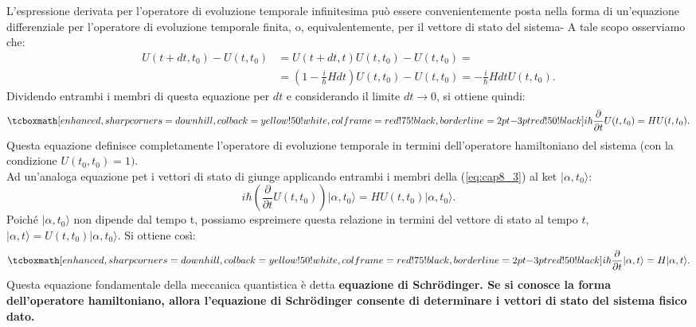 L'espressione derivata per l'operatore di evoluzione temporale infinitesima può essere convenientemente posta nella forma di un'equazione differenziale per l'operatore di evoluzione temporale finita, o, equivalentemente, per il vettore di stato del sistema- A tale scopo osserviamo che:
	\begin{align}
		U(t+dt,t_0)-U(t,t_0)&=  U(t+dt,t)U(t,t_0)-U(t,t_0)= \nonumber\\
		& =\left(1-\frac{i}{\hbar}Hdt \right)U(t,t_0)-U(t,t_0)=-\frac{i}{\hbar}Hdt U(t,t_0).
	\end{align}
Dividendo entrambi i membri di questa equazione per $dt$ e considerando il limite $dt \longrightarrow 0$, si ottiene quindi:
	\begin{equation}
		\tcboxmath[enhanced, sharp corners=downhill, colback=yellow!50!white, colframe=red!75!black, borderline={2pt}{-3pt}{red!50!black}]{
			i\hbar \frac{\partial}{\partial t} U (t, t_0)= H U(t,t_0).
			}
	\label{eq:cap8_3}
	\end{equation}
Questa equazione definisce completamente l'operatore di evoluzione temporale in termini dell'operatore hamiltoniano del sistema (con la condizione $U(t_0,t_0)=1).$\\

Ad un'analoga equazione pet i vettori di stato di giunge applicando entrambi i membri della (\ref{eq:cap8_3}) al ket $\vert \alpha, t_0\rangle$:
	\begin{equation}
		i\hbar \left( \frac{\partial}{\partial t} U (t,t_0) \right) \vert \alpha, t_0\rangle= H U(t, t_0)\vert \alpha, t_0\rangle.
	\end{equation}
Poiché $\vert \alpha, t_0\rangle$ non dipende dal tempo t, possiamo espreimere questa relazione in termini del vettore di stato al tempo $t$, $\vert \alpha, t\rangle= U(t,t_0)\vert \alpha, t_0\rangle$. Si ottiene così:
	\begin{equation}
		\tcboxmath[enhanced, sharp corners=downhill, colback=yellow!50!white, colframe=red!75!black, borderline={2pt}{-3pt}{red!50!black}]{
		i\hbar \frac{\partial}{\partial t} \vert \alpha, t \rangle = H \vert \alpha, t \rangle.
		}
	\end{equation}
Questa equazione fondamentale della meccanica quantistica è detta \textbf{equazione di Schr\"{o}dinger. Se si conosce la forma dell'operatore hamiltoniano, allora l'equazione di Schr\"{o}dinger consente di determinare i vettori di stato del sistema fisico dato.}
